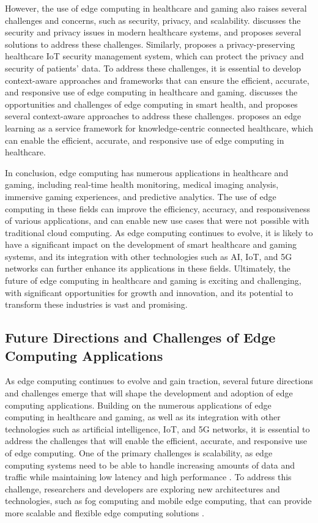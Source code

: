 \documentclass[11pt]{article}
\begin{document}
However, the use of edge computing in healthcare and gaming also raises several challenges and concerns, such as security, privacy, and scalability. \cite{ref57} discusses the security and privacy issues in modern healthcare systems, and proposes several solutions to address these challenges. Similarly, \cite{ref58} proposes a privacy-preserving healthcare IoT security management system, which can protect the privacy and security of patients' data. To address these challenges, it is essential to develop context-aware approaches and frameworks that can ensure the efficient, accurate, and responsive use of edge computing in healthcare and gaming. \cite{ref59} discusses the opportunities and challenges of edge computing in smart health, and proposes several context-aware approaches to address these challenges. \cite{ref60} proposes an edge learning as a service framework for knowledge-centric connected healthcare, which can enable the efficient, accurate, and responsive use of edge computing in healthcare.

In conclusion, edge computing has numerous applications in healthcare and gaming, including real-time health monitoring, medical imaging analysis, immersive gaming experiences, and predictive analytics. The use of edge computing in these fields can improve the efficiency, accuracy, and responsiveness of various applications, and can enable new use cases that were not possible with traditional cloud computing. As edge computing continues to evolve, it is likely to have a significant impact on the development of smart healthcare and gaming systems, and its integration with other technologies such as AI, IoT, and 5G networks can further enhance its applications in these fields. Ultimately, the future of edge computing in healthcare and gaming is exciting and challenging, with significant opportunities for growth and innovation, and its potential to transform these industries is vast and promising.

\subsection{Future Directions and Challenges of Edge Computing Applications}

As edge computing continues to evolve and gain traction, several future directions and challenges emerge that will shape the development and adoption of edge computing applications. Building on the numerous applications of edge computing in healthcare and gaming, as well as its integration with other technologies such as artificial intelligence, IoT, and 5G networks, it is essential to address the challenges that will enable the efficient, accurate, and responsive use of edge computing. One of the primary challenges is scalability, as edge computing systems need to be able to handle increasing amounts of data and traffic while maintaining low latency and high performance \cite{ref2}. To address this challenge, researchers and developers are exploring new architectures and technologies, such as fog computing and mobile edge computing, that can provide more scalable and flexible edge computing solutions \cite{ref19}.
\end{document}

